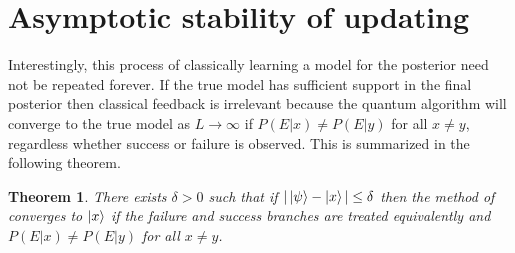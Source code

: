 \documentclass[aps,amsmath,onecolumn,amssymb]{revtex4}
\newtheorem{theorem}{Theorem}
\begin{document}
\section{Asymptotic stability of updating}
\label{app:stab}
Interestingly, this process of classically learning a model for the posterior need not be repeated forever.  If the true model has sufficient support in the final posterior then classical feedback is irrelevant because the quantum algorithm will converge to the true model as $L\rightarrow \infty$ if $P(E|x) \ne P(E|y)$ for all $x\ne y$, regardless whether success or failure is observed.  This is summarized in the following theorem.
\begin{theorem}
There exists $\delta>0$ such that if $|\left|\psi\right\rangle - \left|x\right\rangle| \le \delta$ then the method of~ converges to $\left|x\right\rangle$ if the failure and success branches are treated equivalently and $P(E|x) \ne P(E|y)$ for all $x\ne y$.
\end{theorem}
\end{document}
